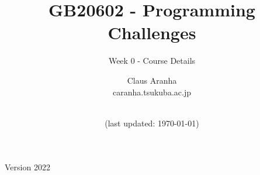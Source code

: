 \documentclass[aspectratio=169]{beamer}
\title[Programming Challenges]{GB20602 - Programming Challenges}
\subtitle[Week 0]{Week 0 - Course Details}
\author[Claus Aranha]{Claus Aranha\\{\footnotesize caranha\@@cs.tsukuba.ac.jp}}
\institute[]{College of Information Sciences}
\date[]{\\{\smaller(last updated: \today)}}
\begin{document}
\begin{CJK}{UTF8}{ipxm}

\begin{frame}
\maketitle
\vfill

\hfill Version 2022
\end{frame}





\end{CJK}
\end{document}
